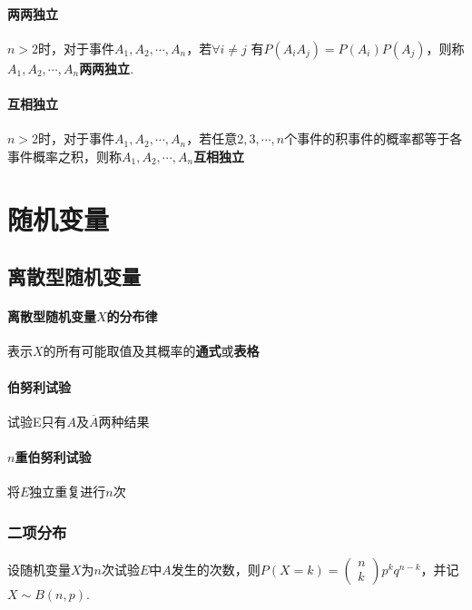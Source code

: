 \documentclass[UTF8]{ctexart}
\begin{document}
\paragraph{两两独立}
$n>2$时，对于事件$A_1,A_2,\cdots,A_n$，若$\forall i\not=j$
有$P(A_iA_j)=P(A_i)P(A_j)$，则称$A_1,A_2,\cdots,A_n$\songti\textbf{两两独立}.

\paragraph{互相独立}
$n>2$时，对于事件$A_1,A_2,\cdots,A_n$，若任意$2,3,\cdots,n$个事件的积事件的概率都等于各事件概率之积，则称$A_1,A_2,\cdots,A_n$\songti\textbf{互相独立}

\section{随机变量}
\subsection{离散型随机变量}

\paragraph{离散型随机变量$X$的分布律}表示$X$的所有可能取值及其概率的\textbf{通式}或\textbf{表格}

\paragraph{伯努利试验}试验E只有$A$及$\overline A$两种结果

\paragraph{$n$重伯努利试验}将$E$独立重复进行$n$次

\subsubsection{二项分布}
设随机变量$X$为$n$次试验$E$中$A$发生的次数，则$P(X=k)=\left(\begin{matrix}{}n\\k \end{matrix} \right) p^kq^{n-k}$，并记$X\sim B(n,p).$
\end{document}
